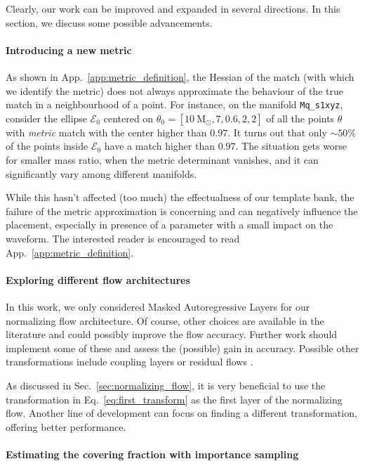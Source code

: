 \documentclass[twocolumn,showpacs,preprintnumbers,nofootinbib,prd,
superscriptaddress,10pt]{revtex4-2}
\begin{document}
Clearly, our work can be improved and expanded in several directions. In this section, we discuss some possible advancements.

\paragraph{Introducing a new metric}

As shown in App.~\ref{app:metric_definition}, the Hessian of the match (with which we identify the metric) does not always approximate the behaviour of the true match in a neighbourhood of a point.
For instance, on the manifold \texttt{Mq\_s1xyz}, consider the ellipse $\mathcal{E}_0$ centered on ${\theta_0 = [\SI{10}{\mathrm{M_\odot}}, 7, 0.6, 2, 2]}$ of all the points $\theta$ with {\it metric} match with the center higher than $0.97$.
It turns out that only $\sim 50\%$ of the points inside $\mathcal{E}_0$ have a match higher than $0.97$. The situation gets worse for smaller mass ratio, when the metric determinant vanishes, and it can significantly vary among different manifolds.

While this hasn't affected (too much) the effectualness of our template bank, the failure of the metric approximation is concerning and can negatively influence the placement, especially in presence of a parameter with a small impact on the waveform. The interested reader is encouraged to read App.~\ref{app:metric_definition}.

\paragraph{Exploring different flow architectures}

In this work, we only considered Masked Autoregressive Layers for our normalizing flow architecture. Of course, other choices are available in the literature and could possibly improve the flow accuracy. Further work should implement some of these and assess the (possible) gain in accuracy.
Possible other transformations include coupling layers \cite{Dinh2014NICENI,Dinh2016DensityEU} or residual flows \cite{NIPS1999_e6384711, Behrmann2018InvertibleRN}.

As discussed in Sec.~\ref{sec:normalizing_flow}, it is very beneficial to use the transformation in Eq.~\eqref{eq:first_transform} as the first layer of the normalizing flow. Another line of development can focus on finding a different transformation, offering better performance.

\paragraph{Estimating the covering fraction with importance sampling}
\end{document}
